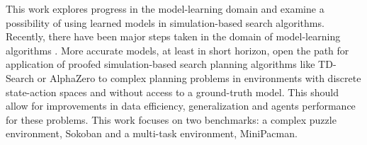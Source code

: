 This work explores progress in the model-learning domain and examine a possibility of using learned models in simulation-based search algorithms. Recently, there have been major steps taken in the domain of model-learning algorithms \cite{Algo.RecurrentEnvSim}\cite{Algo.JointFrameRewardPrediction}\cite{Algo.FastGenerativeModels}\cite{Algo.PlaNet}. More accurate models, at least in short horizon, open the path for application of proofed simulation-based search planning algorithms like TD-Search \cite{Algo.TDSearch} or AlphaZero \cite{Algo.AlphaZero} to complex planning problems in environments with discrete state-action spaces and without access to a ground-truth model. This should allow for improvements in data efficiency, generalization and agents performance for these problems. This work focuses on two benchmarks: a complex puzzle environment, Sokoban and a multi-task environment, MiniPacman.
